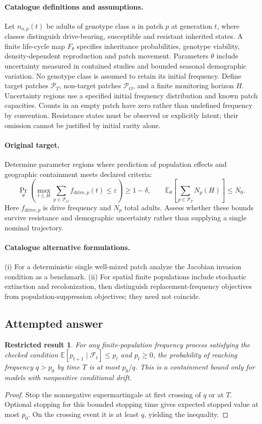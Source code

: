 \documentclass[11pt]{article}
\newcommand{\E}{\mathbb E}
\providecommand{\E}{\mathbb E}
\newtheorem{attemptresult}{Restricted result}[section]
\begin{document}
\paragraph{Catalogue definitions and assumptions.}
Let $n_{a,p}(t)$ be adults of genotype class $a$ in patch $p$ at generation $t$, where classes distinguish drive-bearing, susceptible and resistant inherited states. A finite life-cycle map $F_\theta$ specifies inheritance probabilities, genotype viability, density-dependent reproduction and patch movement. Parameters $\theta$ include uncertainty measured in contained studies and bounded seasonal demographic variation. No genotype class is assumed to retain its initial frequency. Define target patches $\mathcal P_T$, non-target patches $\mathcal P_O$, and a finite monitoring horizon $H$. Uncertainty regions use a specified initial frequency distribution and known patch capacities. Counts in an empty patch have zero rather than undefined frequency by convention. Resistance states must be observed or explicitly latent; their omission cannot be justified by initial rarity alone.
\paragraph{Original target.}
Determine parameter regions where prediction of population effects and geographic containment meets declared criteria:
\[
 \Pr_\theta\!\left(\max_{t\le H}\sum_{p\in\mathcal P_O}
 f_{\mathrm{drive},p}(t)\le\varepsilon\right)\ge1-\delta,
 \qquad
 \E_\theta\!\left[\sum_{p\in\mathcal P_T}N_p(H)\right]\le N_0.
\]
Here $f_{\mathrm{drive},p}$ is drive frequency and $N_p$ total adults. Assess whether these bounds survive resistance and demographic uncertainty rather than supplying a single nominal trajectory.
\paragraph{Catalogue alternative formulations.}
(i) For a deterministic single well-mixed patch analyze the Jacobian invasion condition as a benchmark. (ii) For spatial finite populations include stochastic extinction and recolonization, then distinguish replacement-frequency objectives from population-suppression objectives; they need not coincide.
\subsection{Attempted answer}
\begin{attemptresult}
For any finite-population frequency process satisfying the checked condition $\E[p_{t+1}\mid\mathcal F_t]\leq p_t$ and $p_t\geq0$, the probability of reaching frequency $q>p_0$ by time $T$ is at most $p_0/q$. This is a containment bound only for models with nonpositive conditional drift.
\end{attemptresult}
\begin{proof}
Stop the nonnegative supermartingale at first crossing of $q$ or at $T$. Optional stopping for this bounded stopping time gives expected stopped value at most $p_0$. On the crossing event it is at least $q$, yielding the inequality.
\end{proof}
\end{document}

